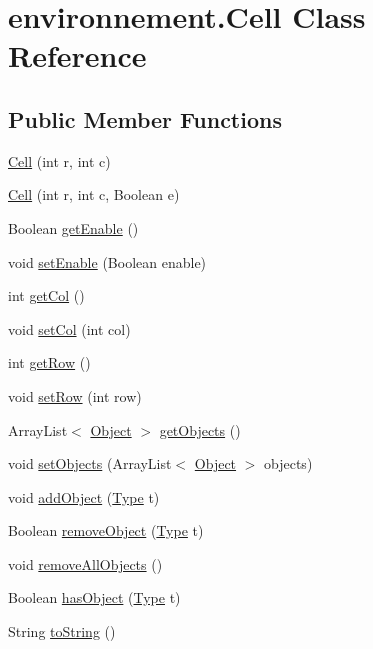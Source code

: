 \hypertarget{classenvironnement_1_1_cell}{}\section{environnement.\+Cell Class Reference}
\label{classenvironnement_1_1_cell}
\subsection*{Public Member Functions}
\begin{DoxyCompactItemize}
\item 
\hyperlink{classenvironnement_1_1_cell_ada829b1f91021c63aa07bea9f9f4285c}{Cell} (int r, int c)
\item 
\hyperlink{classenvironnement_1_1_cell_a811f3e78d96ea09509dd67cfd23cde66}{Cell} (int r, int c, Boolean e)
\item 
Boolean \hyperlink{classenvironnement_1_1_cell_a25650d3cbb77512f24039d6ac9d454ba}{get\+Enable} ()
\item 
void \hyperlink{classenvironnement_1_1_cell_a6581171e649b2eca5bf1ebfcdc106ed9}{set\+Enable} (Boolean enable)
\item 
int \hyperlink{classenvironnement_1_1_cell_ab4854841abcb284f9478c921dd3c86d3}{get\+Col} ()
\item 
void \hyperlink{classenvironnement_1_1_cell_a864f6711fd70a6fa132f8c2280db72af}{set\+Col} (int col)
\item 
int \hyperlink{classenvironnement_1_1_cell_a614f23d343407efa4f07156f414522db}{get\+Row} ()
\item 
void \hyperlink{classenvironnement_1_1_cell_a66a02095836f9791548e7ef0547569b5}{set\+Row} (int row)
\item 
Array\+List$<$ \hyperlink{classenvironnement_1_1_object}{Object} $>$ \hyperlink{classenvironnement_1_1_cell_a2423a51a5e48790cea89061c3793357a}{get\+Objects} ()
\item 
void \hyperlink{classenvironnement_1_1_cell_a7a5be16d3f2bd085a86e67d2266680eb}{set\+Objects} (Array\+List$<$ \hyperlink{classenvironnement_1_1_object}{Object} $>$ objects)
\item 
void \hyperlink{classenvironnement_1_1_cell_aedfad655287c0ae1fda977ec15efb6a0}{add\+Object} (\hyperlink{enumenvironnement_1_1_type}{Type} t)
\item 
Boolean \hyperlink{classenvironnement_1_1_cell_ad83c17c96dae12f864af43ad546f86f3}{remove\+Object} (\hyperlink{enumenvironnement_1_1_type}{Type} t)
\item 
void \hyperlink{classenvironnement_1_1_cell_a1844f98b1999045deb72d45c7ec0ff21}{remove\+All\+Objects} ()
\item 
Boolean \hyperlink{classenvironnement_1_1_cell_a3551332fb08fc588ca65714cc7642046}{has\+Object} (\hyperlink{enumenvironnement_1_1_type}{Type} t)
\item 
String \hyperlink{classenvironnement_1_1_cell_ab3f7830b0b36a34150a732d2f17ba66d}{to\+String} ()
\end{DoxyCompactItemize}


